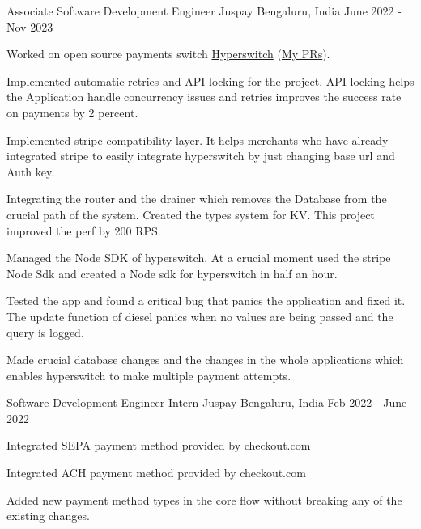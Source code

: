 \begin{cventries}
  \cventry
    {Associate Software Development Engineer} %
    {Juspay} %
    {Bengaluru, India} %
    {June 2022 - Nov 2023} %
    {
      \begin{cvitems} %
        \item {Worked on open source payments switch \href{https://github.com/juspay/hyperswitch}{Hyperswitch} (\href{https://github.com/juspay/hyperswitch/pulls?q=is\%3Apr+author\%3AAbhicodes-crypto+is\%3Aclosed}{My PRs}).}
        \item {Implemented automatic retries and \href{https://github.com/juspay/hyperswitch/pull/1898}{API locking} for the project. API locking helps the Application handle concurrency issues and retries improves the success rate on payments by 2 percent.}
        \item {Implemented stripe compatibility layer. It helps merchants who have already integrated stripe to easily integrate hyperswitch by just changing base url and Auth key. }
        \item {Integrating the router and the drainer which removes the Database from the crucial path of the system. Created the types system for KV. This project improved the perf by 200 RPS.}
        \item {Managed the Node SDK of hyperswitch. At a crucial moment used the stripe Node Sdk and created a Node sdk for hyperswitch in half an hour. }
        \item {Tested the app and found a critical bug that panics the application and fixed it. The update function of diesel panics when no values are being passed and the query is logged. }
        \item {Made crucial database changes and the changes in the whole applications which enables hyperswitch to make multiple payment attempts. }
      \end{cvitems}
    }

\cventry
    {Software Development Engineer Intern} %
    {Juspay} %
    {Bengaluru, India} %
    {Feb 2022 - June 2022} %
    {
      \begin{cvitems} %
        \item {Integrated SEPA payment method provided by checkout.com}
        \item {Integrated ACH payment method provided by checkout.com}
        \item {Added new payment method types in the core flow without breaking any of the existing changes.}
      \end{cvitems}
    }
    

\end{cventries}
